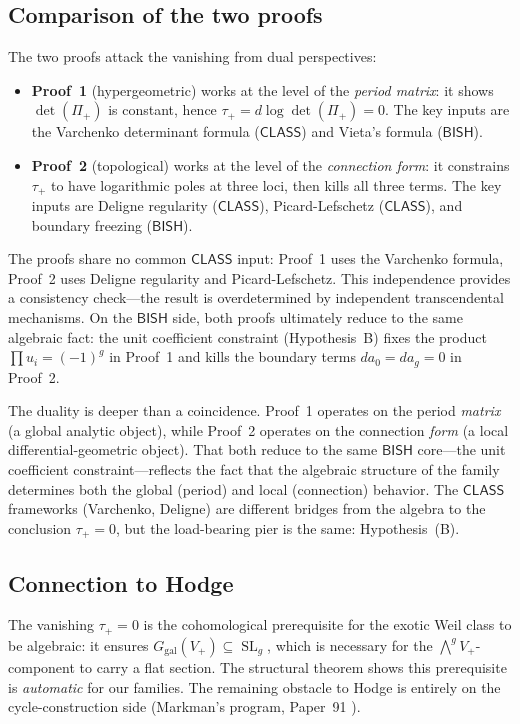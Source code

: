 \documentclass[11pt]{article}
\theoremstyle{plain}
\theoremstyle{definition}
\theoremstyle{remark}
\newcommand{\SL}{\operatorname{SL}}
\newcommand{\BISH}{\mathsf{BISH}}
\newcommand{\CLASS}{\mathsf{CLASS}}
\begin{document}
\subsection{Comparison of the two proofs}

The two proofs attack the vanishing from dual perspectives:
\begin{itemize}
  \item \textbf{Proof~1} (hypergeometric) works at the level of the
    \emph{period matrix}: it shows $\det(\Pi_+)$ is constant, hence
    $\tau_+ = d\log\det(\Pi_+) = 0$.  The key inputs are the Varchenko
    determinant formula ($\CLASS$) and Vieta's formula ($\BISH$).
  \item \textbf{Proof~2} (topological) works at the level of the
    \emph{connection form}: it constrains $\tau_+$ to have logarithmic
    poles at three loci, then kills all three terms.  The key inputs
    are Deligne regularity ($\CLASS$), Picard-Lefschetz ($\CLASS$),
    and boundary freezing ($\BISH$).
\end{itemize}
The proofs share no common $\CLASS$ input: Proof~1 uses the Varchenko formula,
Proof~2 uses Deligne regularity and Picard-Lefschetz.  This independence
provides a consistency check---the result is overdetermined by independent
transcendental mechanisms.  On the $\BISH$ side, both proofs ultimately reduce
to the same algebraic fact: the unit coefficient constraint (Hypothesis~B)
fixes the product $\prod u_i = (-1)^g$ in Proof~1 and kills the boundary
terms $da_0 = da_g = 0$ in Proof~2.

The duality is deeper than a coincidence.  Proof~1 operates on the period
\emph{matrix} (a global analytic object), while Proof~2 operates on the
connection \emph{form} (a local differential-geometric object).  That both
reduce to the same $\BISH$ core---the unit coefficient constraint---reflects
the fact that the algebraic structure of the family determines both the
global (period) and local (connection) behavior.  The $\CLASS$ frameworks
(Varchenko, Deligne) are different bridges from the algebra to the
conclusion $\tau_+ = 0$, but the load-bearing pier is the same:
Hypothesis~(B).

\subsection{Connection to Hodge}

The vanishing $\tau_+ = 0$ is the cohomological prerequisite for the exotic
Weil class to be algebraic: it ensures $G_\mathrm{gal}(V_+) \subseteq \SL_g$,
which is necessary for the $\bigwedge^g V_+$-component to carry a flat section.
The structural theorem shows this prerequisite is \emph{automatic} for
our families.  The remaining obstacle to Hodge is entirely on the
cycle-construction side (Markman's program, Paper~91 \cite{p91}).
\end{document}
